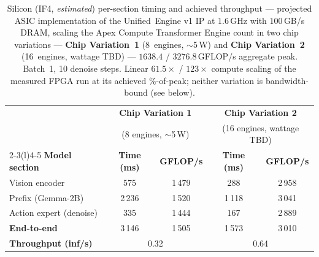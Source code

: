 \documentclass[11pt]{article}
\newcommand{\ue}{Unified~Engine}
\newcommand{\iffour}{IF4}
\begin{document}
\begin{table}[H]
\centering\small
\caption{Silicon (\iffour{}, \emph{estimated}) per-section timing and achieved
throughput --- projected ASIC implementation of the \ue{} v1 IP at
$1.6$\,GHz with $100$\,GB/s DRAM, scaling the Apex Compute Transformer
Engine count in two chip variations ---
\textbf{Chip Variation~1} (8~engines, $\sim$5\,W) and \textbf{Chip
Variation~2} (16~engines, wattage TBD) --- $1638.4$ /
$3276.8$\,GFLOP/s aggregate peak.
Batch~1, 10 denoise steps. Linear $61.5\times$ / $123\times$ compute scaling
of the measured FPGA run at its achieved \%-of-peak; neither variation is
bandwidth-bound (see below).}
\label{tab:timing-silicon}
\begin{tabular}{@{}lcccc@{}}
\toprule
& \multicolumn{2}{c}{\textbf{Chip Variation 1}} & \multicolumn{2}{c}{\textbf{Chip Variation 2}} \\
& \multicolumn{2}{c}{\footnotesize (8 engines, $\sim$5\,W)} & \multicolumn{2}{c}{\footnotesize (16 engines, wattage TBD)} \\
\cmidrule(lr){2-3}\cmidrule(l){4-5}
\textbf{Model section} & \textbf{Time (ms)} & \textbf{GFLOP/s} & \textbf{Time (ms)} & \textbf{GFLOP/s} \\
\midrule
Vision encoder          & 575 & 1\,479 & 288 & 2\,958 \\
Prefix (Gemma-2B)       & 2\,236 & 1\,520 & 1\,118 & 3\,041 \\
Action expert (denoise) & 335 & 1\,444 & 167 & 2\,889 \\
\midrule
\textbf{End-to-end}     & 3\,146 & 1\,505 & 1\,573 & 3\,010 \\
\textbf{Throughput (inf/s)} & \multicolumn{2}{c}{0.32} & \multicolumn{2}{c}{0.64} \\
\bottomrule
\end{tabular}
\end{table}
\end{document}
